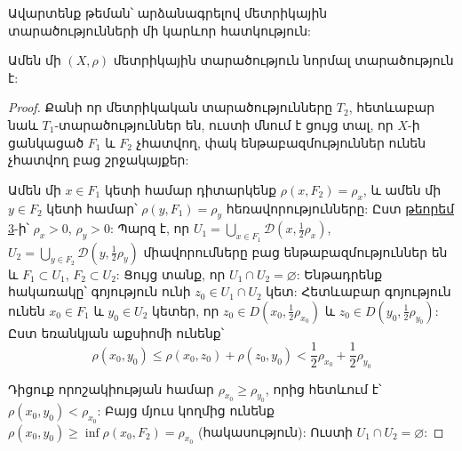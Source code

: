 \documentclass[./main.tex]{subfiles}
\begin{document}
\par Ավարտենք թեման՝ արձանագրելով մետրիկային տարածությունների մի կարևոր հատկություն:

\begin{theorem}\label{ch7thm6}
    Ամեն մի $(X, \rho)$ մետրիկային տարածություն նորմալ տարածություն է:
\end{theorem}

\begin{proof}
\par Քանի որ մետրիկական տարածությունները $T_2$, հետևաբար նաև $T_1$-տարածություններ են, ուստի մնում է ցույց տալ, որ $X$-ի ցանկացած $F_1$ և $F_2$ չհատվող, փակ ենթաբազմություններ ունեն չհատվող բաց շրջակայքեր:

\par Ամեն մի $x \in F_1$ կետի համար դիտարկենք $\rho(x, F_2)=\rho_x$, և ամեն մի $y \in F_2$ կետի համար՝ $\rho(y, F_1)=\rho_y$ հեռավորությունները: Ըստ \hyperref[ch7thm3]{թեորեմ 3}-ի՝ $\rho_x > 0$, $\rho_y > 0$: Պարզ է, որ ${U_1 = \bigcup\limits_{x \in F_1} \mathcal{D}(x, \frac{1}{2}\rho_x)}$, ${U_2 = \bigcup\limits_{y \in F_2} \mathcal{D}(y, \frac{1}{2}\rho_y)}$ միավորումները բաց ենթա\-բազ\-մու\-թյուն\-ներ են և $F_1 \subset U_1$, $F_2 \subset U_2$: Ցույց տանք, որ $U_1 \cap U_2 = \varnothing$: Են\-թա\-դրենք հակառակը՝ գոյություն ունի $z_0 \in U_1 \cap U_2$ կետ: Հետևաբար գոյություն ունեն $x_0 \in F_1$ և $y_0 \in U_2$ կետեր, որ $z_0 \in D(x_0, \frac{1}{2}\rho_{x_0})$ և $z_0 \in D(y_0, \frac{1}{2}\rho_{y_0})$:
Ըստ եռանկյան աքսիոմի ունենք՝
\[
\rho(x_0, y_0) \le \rho(x_0, z_0) + \rho(z_0, y_0) < \frac{1}{2}\rho_{x_0} + \frac{1}{2}\rho_{y_0}
\]

\par Դիցուք որոշակիության համար $\rho_{x_0} \ge \rho_{y_0}$, որից հետևում է՝
$\rho(x_0, y_0) < \rho_{x_0}$: Բայց մյուս կողմից ունենք $\rho(x_0, y_0) \ge \inf \rho(x_0, F_2) = \rho_{x_0}$ (հակասություն): Ուստի \linebreak $U_1 \cap U_2 = \varnothing$:
\end{proof}



\end{document}
